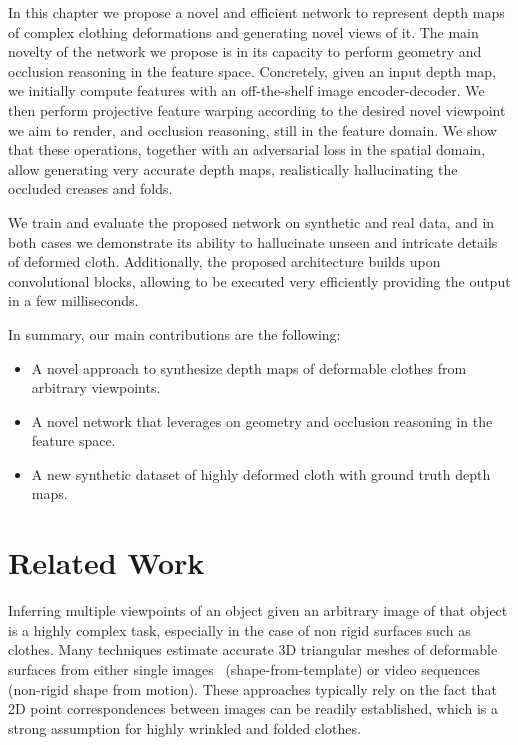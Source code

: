 In this chapter we propose a novel and efficient network to represent depth maps of complex clothing deformations and generating novel views of it. The main novelty of the  network we propose is in its capacity to  perform geometry and occlusion reasoning in the feature space. Concretely, given an input depth map, we initially compute features with an off-the-shelf image encoder-decoder. We then perform projective feature warping according to the desired novel viewpoint we aim to render, and occlusion reasoning, still in the feature domain. We show that these operations, together with an adversarial loss in the spatial domain, allow generating very accurate depth maps, realistically hallucinating the occluded creases and folds.

We train and evaluate  the proposed network on  synthetic and real data, and in both cases we demonstrate its ability to hallucinate unseen and intricate details of deformed cloth. Additionally, the proposed architecture builds upon convolutional blocks, allowing to be executed very efficiently providing the output in a few milliseconds. %

In summary, our main contributions are the following:
 \begin{itemize}\setlength{\itemsep}{0pt}
\item A novel approach to synthesize depth maps of deformable clothes from arbitrary viewpoints.
\item A novel network that leverages on geometry and occlusion reasoning in the feature space.
\item A new synthetic dataset of highly deformed cloth with ground truth depth maps. 
\end{itemize}

\section{Related Work}

Inferring multiple viewpoints of an object given an arbitrary image of that object is a highly complex task, especially in the case of non rigid surfaces such as clothes.
Many techniques estimate accurate 3D triangular meshes of deformable surfaces from either single images~\cite{Parashar2019pami,Moreno_pami2013,pumarola2018geometry} (shape-from-template) or video sequences~\cite{Agudo_pami2016,Agudo2017ijcv,Chhatkuli2016cvpr,Moreno_cvpr2011b} (non-rigid shape from motion). These approaches typically rely on the fact that 2D point correspondences between images can be readily established, which is a strong assumption for highly wrinkled and folded clothes. 

